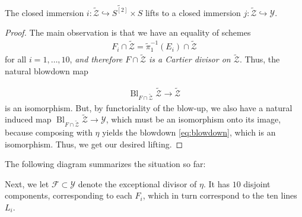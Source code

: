 \documentclass[12pt,reqno]{amsart}
\DeclareMathOperator{\id}{id}
\DeclareMathOperator{\Bl}{Bl}
\renewcommand{\to}{{\longrightarrow}}
\numberwithin{equation}{section}
\newcommand{\td}{\widetilde}
\begin{document}
\begin{lemma}
  The closed immersion
  $i: \widetilde{\mathcal{Z}} \hookrightarrow \widetilde{S^{[2]}}
  \times S$ lifts to a closed immersion
  $j: \widetilde{\mathcal{Z}} \hookrightarrow  \mathcal{Y}$.
\end{lemma}

\begin{proof}
  The main observation is that we have an equality of schemes
  \begin{align}
    \label{eq:Cartier}
    F_i \cap \widetilde{\mathcal{Z}} = \widetilde{\pi}_{1}^{-1}(E_i) \cap \widetilde{\mathcal{Z}}
  \end{align}
  for all $i=1, \dots, 10$, {\sl and therefore
    $F \cap \widetilde{\mathcal{Z}}$ is a Cartier divisor on
    $\widetilde{\mathcal{Z}}$}.  Thus, the natural blowdown map

  \begin{align}
    \label{eq:blowdown}
    \Bl_{F \cap \td{\mathcal{Z}}}\td{\mathcal{Z}} \to \td{\mathcal{Z}}
  \end{align}
  is an isomorphism.  But, by functoriality of the blow-up, we also
  have a natural induced map
  $\Bl_{F \cap \td{\mathcal{Z}}}\td{\mathcal{Z}} \to \mathcal{Y}$,
  which must be an isomorphism onto its image, because composing with
  $\eta$ yields the blowdown \eqref{eq:blowdown}, which is an
  isomorphism.  Thus, we get our desired lifting.
\end{proof}

The following diagram summarizes the situation so far:

\begin{center}
\end{center}

Next, we let $\mathcal{F} \subset \mathcal{Y}$ denote the exceptional
divisor of $\eta$. It has $10$ disjoint components, corresponding to
each $F_{i}$, which in turn correspond to the ten lines $L_{i}$.
\end{document}

